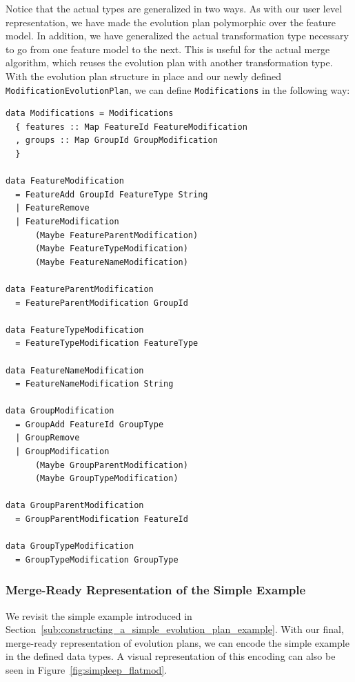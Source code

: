 \documentclass[a4paper,english]{ifimaster}
\begin{document}
Notice that the actual types are generalized in two ways. As with our user level representation, we have made the evolution plan polymorphic over the feature model. In addition, we have generalized the actual transformation type necessary to go from one feature model to the next. This is useful for the actual merge algorithm, which reuses the evolution plan with another transformation type. With the evolution plan structure in place and our newly defined \texttt{Modification\-Evolution\-Plan}, we can define \texttt{Modifications} in the following way:

\begin{verbatim}
data Modifications = Modifications
  { features :: Map FeatureId FeatureModification
  , groups :: Map GroupId GroupModification
  }

data FeatureModification
  = FeatureAdd GroupId FeatureType String
  | FeatureRemove
  | FeatureModification
      (Maybe FeatureParentModification)
      (Maybe FeatureTypeModification)
      (Maybe FeatureNameModification)

data FeatureParentModification
  = FeatureParentModification GroupId

data FeatureTypeModification
  = FeatureTypeModification FeatureType

data FeatureNameModification
  = FeatureNameModification String

data GroupModification
  = GroupAdd FeatureId GroupType
  | GroupRemove
  | GroupModification
      (Maybe GroupParentModification)
      (Maybe GroupTypeModification)

data GroupParentModification
  = GroupParentModification FeatureId

data GroupTypeModification
  = GroupTypeModification GroupType
\end{verbatim}

\subsubsection{Merge-Ready Representation of the Simple Example}%
\label{ssub:merge_ready_representation_of_the_simple_example}

We revisit the simple example introduced in Section~\vref{sub:constructing_a_simple_evolution_plan_example}. With our final, merge-ready representation of evolution plans, we can encode the simple example in the defined data types. A visual representation of this encoding can also be seen in Figure~\vref{fig:simpleep_flatmod}.
\end{document}
